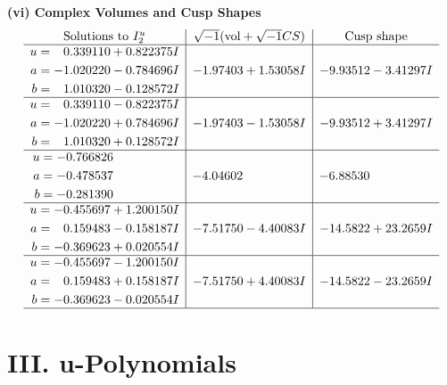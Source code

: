 \documentclass[1p]{elsarticle_modified}
\theoremstyle{definition}
\newcommand{\I}{\sqrt{-1}}
\begin{document}
\newpage\flushleft \textbf{(vi) Complex Volumes and Cusp Shapes}
$$\begin{array}{c|c|c}  
\text{Solutions to }I^u_{2}& \I (\text{vol} + \sqrt{-1}CS) & \text{Cusp shape}\\
 \hline 
\begin{aligned}
u &= \phantom{-}0.339110 + 0.822375 I \\
a &= -1.020220 - 0.784696 I \\
b &= \phantom{-}1.010320 - 0.128572 I\end{aligned}
 & -1.97403 + 1.53058 I & -9.93512 - 3.41297 I \\ \hline\begin{aligned}
u &= \phantom{-}0.339110 - 0.822375 I \\
a &= -1.020220 + 0.784696 I \\
b &= \phantom{-}1.010320 + 0.128572 I\end{aligned}
 & -1.97403 - 1.53058 I & -9.93512 + 3.41297 I \\ \hline\begin{aligned}
u &= -0.766826\phantom{ +0.000000I} \\
a &= -0.478537\phantom{ +0.000000I} \\
b &= -0.281390\phantom{ +0.000000I}\end{aligned}
 & -4.04602\phantom{ +0.000000I} & -6.88530\phantom{ +0.000000I} \\ \hline\begin{aligned}
u &= -0.455697 + 1.200150 I \\
a &= \phantom{-}0.159483 - 0.158187 I \\
b &= -0.369623 + 0.020554 I\end{aligned}
 & -7.51750 - 4.40083 I & -14.5822 + 23.2659 I \\ \hline\begin{aligned}
u &= -0.455697 - 1.200150 I \\
a &= \phantom{-}0.159483 + 0.158187 I \\
b &= -0.369623 - 0.020554 I\end{aligned}
 & -7.51750 + 4.40083 I & -14.5822 - 23.2659 I\\
 \hline 
 \end{array}$$\newpage
\newpage\renewcommand{\arraystretch}{1}
\centering \section*{ III. u-Polynomials}
\end{document}
